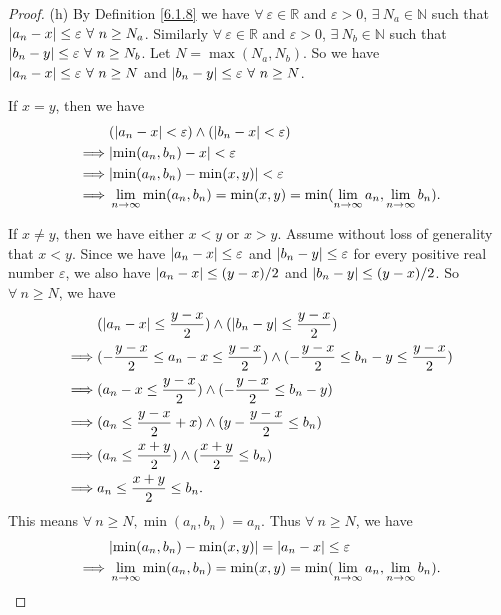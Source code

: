 \begin{proof}{(h)}
By Definition \ref{6.1.8} we have \(\forall\ \varepsilon \in \mathds{R}\) and \(\varepsilon > 0\), \(\exists\ N_a \in \mathds{N}\) such that \(\abs*{a_n - x} \leq \varepsilon \ \forall\ n \geq N_a\).
Similarly \(\forall\ \varepsilon \in \mathds{R}\) and \(\varepsilon > 0\), \(\exists\ N_b \in \mathds{N}\) such that \(\abs*{b_n - y} \leq \varepsilon \ \forall\ n \geq N_b\).
Let \(N = \max(N_a, N_b)\).
So we have \(\abs*{a_n - x} \leq \varepsilon \ \forall\ n \geq N\) and \(\abs*{b_n - y} \leq \varepsilon \ \forall\ n \geq N\).

If \(x = y\), then we have
\begin{align*}
& (\abs*{a_n - x} < \varepsilon) \land (\abs*{b_n - x} < \varepsilon) \\
\implies & \abs*{\min(a_n, b_n) - x} < \varepsilon \\
\implies & \abs*{\min(a_n, b_n) - \min(x, y)} < \varepsilon \\
\implies & \lim_{n \to \infty} \min(a_n, b_n) = \min(x, y) = \min(\lim_{n \to \infty} a_n, \lim_{n \to \infty} b_n).
\end{align*}

If \(x \neq y\), then we have either \(x < y\) or \(x > y\).
Assume without loss of generality that \(x < y\).
Since we have \(\abs*{a_n - x} \leq \varepsilon\) and \(\abs*{b_n - y} \leq \varepsilon\) for every positive real number \(\varepsilon\), we also have \(\abs*{a_n - x} \leq (y - x) / 2\) and \(\abs*{b_n - y} \leq (y - x) / 2\).
So \(\forall\ n \geq N\), we have
\begin{align*}
& (\abs*{a_n - x} \leq \frac{y - x}{2}) \land (\abs*{b_n - y} \leq \frac{y - x}{2}) \\
\implies & (-\frac{y - x}{2} \leq a_n - x \leq \frac{y - x}{2}) \land (-\frac{y - x}{2} \leq b_n - y \leq \frac{y - x}{2}) \\
\implies & (a_n - x \leq \frac{y - x}{2}) \land (-\frac{y - x}{2} \leq b_n - y) \\
\implies & (a_n \leq \frac{y - x}{2} + x) \land (y - \frac{y - x}{2} \leq b_n) \\
\implies & (a_n \leq \frac{x + y}{2}) \land (\frac{x + y}{2} \leq b_n) \\
\implies & a_n \leq \frac{x + y}{2} \leq b_n.
\end{align*}
This means \(\forall\ n \geq N, \min(a_n, b_n) = a_n\).
Thus \(\forall\ n \geq N\), we have
\begin{align*}
& \abs*{\min(a_n, b_n) - \min(x, y)} = \abs*{a_n - x} \leq \varepsilon \\
\implies & \lim_{n \to \infty} \min(a_n, b_n) = \min(x, y) = \min(\lim_{n \to \infty} a_n, \lim_{n \to \infty} b_n).
\end{align*}
\end{proof}

